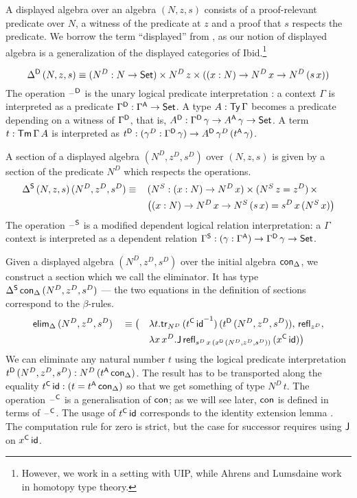 \documentclass[acmsmall,review,anonymous]{acmart}\settopmatter{printfolios=true,printccs=false,printacmref=false}
\begin{document}
A displayed algebra over an algebra $(N,z,s)$ consists of a
proof-relevant predicate over $N$, a witness of the predicate at $z$
and a proof that $s$ respects the predicate. We borrow the term
``displayed'' from \cite{displayedCategories}, as our notion of
displayed algebra is a generalization of the displayed categories of Ibid.\footnote{However, we work in a setting with UIP, while Ahrens and Lumsdaine work in homotopy type theory.}

\[
\Delta^{\mathsf{D}}\,(N,z,s) \equiv (N^D:N\rightarrow\mathsf{Set})\times N^D\,z\times ((x:N)\rightarrow N^D\,x\rightarrow N^D\,(s\,x))
\]
The operation $\mathord{\hspace{1pt}\text{--}\hspace{1pt}}^{\mathsf{D}}$ is the unary logical predicate
interpretation \cite{bernardy12parametricity}: a context $\Gamma$ is
interpreted as a predicate $\Gamma^{\mathsf{D}}:\Gamma^{\mathsf{A}}\rightarrow\mathsf{Set}$. A type
$A:\mathsf{Ty}\,\Gamma$ becomes a predicate depending on a witness of
$\Gamma^{\mathsf{D}}$, that is, $A^{\mathsf{D}}:\Gamma^{\mathsf{D}}\,\gamma\rightarrow
A^{\mathsf{A}}\,\gamma\rightarrow\mathsf{Set}$. A term $t:\mathsf{Tm}\,\Gamma\,A$ is interpreted as
$t^{\mathsf{D}}:(\gamma^D:\Gamma^{\mathsf{D}}\,\gamma)\rightarrow A^{\mathsf{D}}\,\gamma^D\,(t^{\mathsf{A}}\,\gamma)$.

A section of a displayed algebra $(N^D,z^D,s^D)$ over $(N,z,s)$ is
given by a section of the predicate $N^D$ which respects the
operations.
\begin{alignat*}{5}
  & \Delta^{\mathsf{S}}\,(N,z,s)\,(N^D,z^D,s^D) \equiv\, && (N^S:(x:N)\rightarrow N^D\,x)\times (N^S\,z=z^D)\,\times \\
  & && \big((x:N)\rightarrow N^D\,x\rightarrow N^S\,(s\,x) = s^D\,x\,(N^S\,x)\big)
\end{alignat*}
The operation $\mathord{\hspace{1pt}\text{--}\hspace{1pt}}^{\mathsf{S}}$ is a modified dependent logical relation
interpretation: a $\Gamma$ context is interpreted as a dependent
relation $\Gamma^{\mathsf{S}}:(\gamma:\Gamma^{\mathsf{A}})\rightarrow\Gamma^{\mathsf{D}}\,\gamma\rightarrow\mathsf{Set}$.

Given a displayed algebra $(N^D,z^D,s^D)$ over the initial algebra $\mathsf{con}_\Delta$,
we construct a section which we call the eliminator. It has type
$\Delta^{\mathsf{S}}\,\mathsf{con}_\Delta\,(N^D,z^D,s^D)$ --- the two equations in the
definition of sections correspond to the $\beta$-rules.
\begin{alignat*}{5}
  & \mathsf{elim}_\Delta\,(N^D,z^D,s^D) && \equiv \big( && \lambda t.\mathsf{tr}_{N^D}\,({t^{\mathsf{C}}\,\mathsf{id}}^{-1})\,(t^{\mathsf{D}}\,(N^D,z^D,s^D)),\, \mathsf{refl}_{z^D}, \\
  & && && \lambda x\,x^D. \mathsf{J}\,\mathsf{refl}_{s^D\,x\,(x^{\mathsf{D}}\,(N^D,z^D,s^D))}\,(x^{\mathsf{C}}\,\mathsf{id})\big)
\end{alignat*}
We can eliminate any natural number $t$ using the logical predicate
interpretation $t^{\mathsf{D}}\,(N^D,z^D,s^D): N^D\,(t^{\mathsf{A}}\,\mathsf{con}_\Delta)$. The
result has to be transported along the equality $t^{\mathsf{C}}\,\mathsf{id} : (t =
t^{\mathsf{A}}\,\mathsf{con}_\Delta)$ so that we get something of type $N^D\,t$. The
operation $\mathord{\hspace{1pt}\text{--}\hspace{1pt}}^{\mathsf{C}}$ is a generalisation of $\mathsf{con}$; as we will see
later, $\mathsf{con}$ is defined in terms of $\mathord{\hspace{1pt}\text{--}\hspace{1pt}}^{\mathsf{C}}$. The usage of
$t^{\mathsf{C}}\,\mathsf{id}$ corresponds to the identity extension lemma
\cite{atkey}. The computation rule for zero is strict, but the case
for successor requires using $\mathsf{J}$ on $x^{\mathsf{C}}\,\mathsf{id}$.
\end{document}
